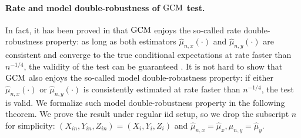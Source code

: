 \documentclass[12pt]{article}
\theoremstyle{definition}
\newcommand{\GCM}{\textnormal{GCM}}						%
\begin{document}
\paragraph{Rate and model double-robustness of $\GCM$ test.}
In fact, it has been proved in \citet{Shah2018} that $\GCM$ enjoys the so-called rate double-robustness property: as long as both estimators $\widehat\mu_{n,x}(\cdot)$ and $\widehat{\mu}_{n,y}(\cdot)$ are consistent and converge to the true conditional expectations at rate faster than $n^{-1/4}$, the validity of the test can be guaranteed \citep[Theorem 6]{Shah2018}. It is not hard to show that $\GCM$ also enjoys the so-called model double-robustness property: if either $\widehat{\mu}_{n,x}(\cdot)$ or $\widehat{\mu}_{n,y}(\cdot)$ is consistently estimated at rate faster than $n^{-1/4}$, the test is valid. We formalize such model double-robustness property in the following theorem. We prove the result under regular iid setup, so we drop the subscript $n$ for simplicity: $(X_{in},Y_{in},Z_{in})=(X_{i},Y_{i},Z_{i})$ and $\widehat{\mu}_{n,x}=\widehat{\mu}_x,\widehat{\mu}_{n,y}=\widehat{\mu}_y$.
\end{document}

